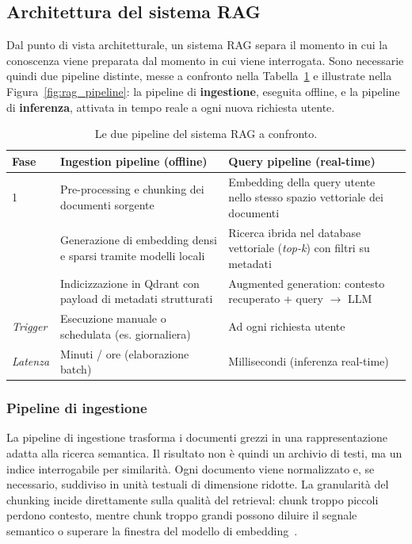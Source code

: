\subsection{Architettura del sistema RAG}
\label{subsec:rag_arch}

Dal punto di vista architetturale, un sistema RAG separa il momento in cui la
conoscenza viene preparata dal momento in cui viene interrogata. Sono necessarie quindi due
pipeline distinte, messe a confronto nella Tabella~\ref{tab:rag_pipelines} e
illustrate nella Figura~\ref{fig:rag_pipeline}: la pipeline di
\textbf{ingestione}, eseguita offline, e la pipeline di \textbf{inferenza},
attivata in tempo reale a ogni nuova richiesta utente.

\begin{table}[ht]
  \centering
  \caption{Le due pipeline del sistema RAG a confronto.}
  \label{tab:rag_pipelines}
  \small
  \begin{tabular}{p{2.5cm}p{5.5cm}p{5.5cm}}
    \toprule
    \textbf{Fase} & \textbf{Ingestion pipeline (offline)}
      & \textbf{Query pipeline (real-time)} \\
    \midrule
    1 & Pre-processing e chunking dei documenti sorgente
      & Embedding della query utente nello stesso spazio vettoriale dei documenti \\
    \addlinespace
    2 & Generazione di embedding densi e sparsi tramite modelli locali
      & Ricerca ibrida nel database vettoriale (\textit{top-k}) con filtri su metadati \\
    \addlinespace
    3 & Indicizzazione in Qdrant con payload di metadati strutturati
      & Augmented generation: contesto recuperato + query $\rightarrow$ LLM \\
    \addlinespace
    \textit{Trigger}  & Esecuzione manuale o schedulata (es. giornaliera)
      & Ad ogni richiesta utente \\
    \addlinespace
    \textit{Latenza}  & Minuti / ore (elaborazione batch)
      & Millisecondi (inferenza real-time) \\
    \bottomrule
  \end{tabular}
\end{table}

\subsubsection{Pipeline di ingestione}

La pipeline di ingestione trasforma i documenti grezzi in una rappresentazione
adatta alla ricerca semantica. Il risultato non è quindi un archivio di
testi, ma un indice interrogabile per similarità. Ogni documento viene
normalizzato e, se necessario, suddiviso in unità testuali di dimensione
ridotte. La granularità del chunking incide direttamente sulla qualità del
retrieval: chunk troppo piccoli perdono contesto, mentre chunk troppo grandi
possono diluire il segnale semantico o superare la finestra del modello di
embedding~\cite{chen2023benchmarking}.

